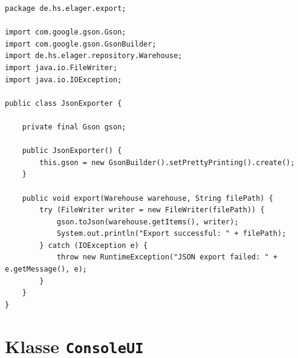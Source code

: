 \documentclass[12pt, a4paper, twoside]{report}
\begin{document}
\begin{lstlisting}[caption={JsonExporter.java -- JSON-Serialisierung}, label={lst:json}]
package de.hs.elager.export;

import com.google.gson.Gson;
import com.google.gson.GsonBuilder;
import de.hs.elager.repository.Warehouse;
import java.io.FileWriter;
import java.io.IOException;

public class JsonExporter {

    private final Gson gson;

    public JsonExporter() {
        this.gson = new GsonBuilder().setPrettyPrinting().create();
    }

    public void export(Warehouse warehouse, String filePath) {
        try (FileWriter writer = new FileWriter(filePath)) {
            gson.toJson(warehouse.getItems(), writer);
            System.out.println("Export successful: " + filePath);
        } catch (IOException e) {
            throw new RuntimeException("JSON export failed: " + e.getMessage(), e);
        }
    }
}
\end{lstlisting}

\section{Klasse \texttt{ConsoleUI}}
\end{document}
